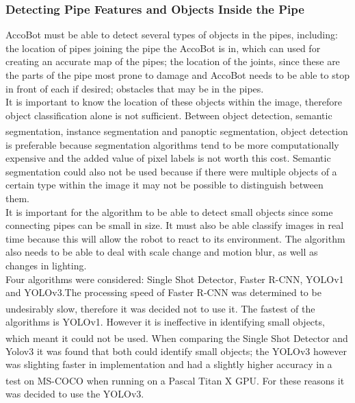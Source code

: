 \documentclass[11pt]{article}		%
\newcommand{\supercite}[1]{\textsuperscript{\cite{#1}}}		%
\begin{document}
		\subsubsection{Detecting Pipe Features and Objects Inside the Pipe}
	AccoBot must be able to detect several types of objects in the pipes, including: the location of pipes joining the pipe the AccoBot is in, which can used for creating an accurate map of the pipes; the location of the joints, since these are the parts of the pipe most prone to damage and AccoBot needs to be able to stop in front of each if desired; obstacles that may be in the pipes. 
\\ \hspace*{3ex}
It is important to know the location of these objects within the image, therefore object classification alone is not sufficient. Between object detection, semantic segmentation, instance segmentation and panoptic segmentation\supercite{segmentation}, object detection is preferable because segmentation algorithms tend to be more computationally expensive and the added value of pixel labels is not worth this cost. Semantic segmentation could also not be used because if there were multiple objects of a certain type within the image it may not be possible to distinguish between them. 
\\ \hspace*{3ex}
It is important for the algorithm to be able to detect small objects since some connecting pipes can be small in size. It must also be able classify images in real time because this will allow the robot to react to its environment. The algorithm also needs to be able to deal with scale change and motion blur, as well as changes in lighting. 
\\ \hspace*{3ex}
Four algorithms were considered: Single Shot Detector, Faster R-CNN, YOLOv1 and YOLOv3.The processing speed of Faster R-CNN was determined to be undesirably slow, therefore it was decided not to use it.\supercite{YOLO} The fastest of the algorithms is YOLOv1. However it is ineffective in identifying small objects, which meant it could not be used.\supercite{YOLO} When comparing the Single Shot Detector and Yolov3 it was found that both could identify small objects; the YOLOv3 however was slighting faster in implementation and had a slightly higher accuracy in a test on MS-COCO when running on a Pascal Titan X GPU.\supercite{YOLO} For these reasons it was decided to use the YOLOv3. 
\\ \hspace*{3ex}
\end{document}
